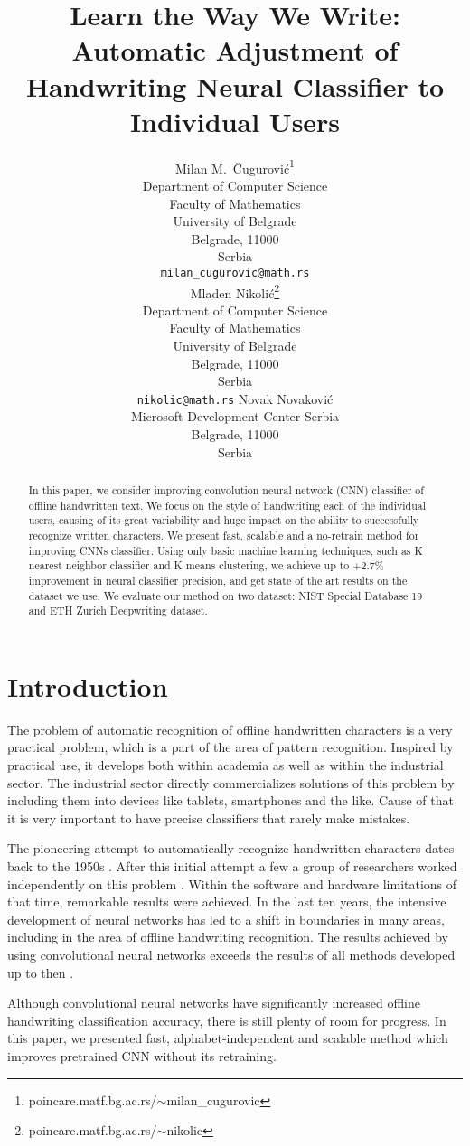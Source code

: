 \documentclass{article}
\title{Learn the Way We Write: Automatic Adjustment of %
Handwriting Neural Classifier to Individual Users}
\author{%
  Milan M.~Čugurović\thanks{poincare.matf.bg.ac.rs/$\sim$milan\_cugurovic} \\
  Department of Computer Science\\
  Faculty of Mathematics\\
  University of Belgrade\\
  Belgrade, 11000\\
  Serbia\\
  \texttt{milan\_cugurovic@math.rs} \\
  \And
  Mladen Nikolić\thanks{poincare.matf.bg.ac.rs/$\sim$nikolic} \\
  Department of Computer Science\\
  Faculty of Mathematics\\
  University of Belgrade\\
  Belgrade, 11000\\
  Serbia\\
  \texttt{nikolic@math.rs}
  \And
  Novak Novaković \\
  Microsoft Development Center Serbia\\
  Belgrade, 11000\\
  Serbia\\
}
\begin{document}
\maketitle

\begin{abstract}
  In this paper, we consider improving convolution neural network (CNN) classifier of offline handwritten text.  
  We focus on the style of handwriting each of the individual users, causing of its great variability and huge impact on the ability to successfully recognize written characters. 
  We present fast, scalable and a no-retrain method for improving CNNs classifier. 
  Using only basic machine learning techniques, such as K nearest neighbor classifier and K means clustering, we achieve up to +2.7\% improvement in neural classifier precision, and get state of the art results on the dataset we use. 
  We evaluate our method on two dataset: NIST Special Database 19 and ETH Zurich Deepwriting dataset. 
\end{abstract}

\section{Introduction}
The problem of automatic recognition of offline handwritten characters is a very practical problem, which is a part of the area of pattern recognition. 
Inspired by practical use, it develops both within academia as well as within the industrial sector. 
The industrial sector directly commercializes solutions of this problem by including them into devices like tablets, smartphones and the like. 
Cause of that it is very important to have precise classifiers that rarely make mistakes. 

The pioneering attempt to automatically recognize handwritten characters dates back to the 1950s \citet{leedham}. 
After this initial attempt a few a group of researchers worked independently on this problem \citet{plamondon}. 
Within the software and hardware limitations of that time, remarkable results were achieved. 
In the last ten years, the intensive development of neural networks has led to a shift in boundaries in many areas, 
including in the area of offline handwriting recognition. 
The results achieved by using convolutional neural networks exceeds the results of all methods developed up to then \citet{cnnbest1} \citet{cnnbest2} \citet{cnnbest3}. 

Although convolutional neural networks have significantly increased offline handwriting classification accuracy, there is still plenty of room for progress. 
In this paper, we presented fast, alphabet-independent and scalable method which improves pretrained CNN without its retraining.
\end{document}
